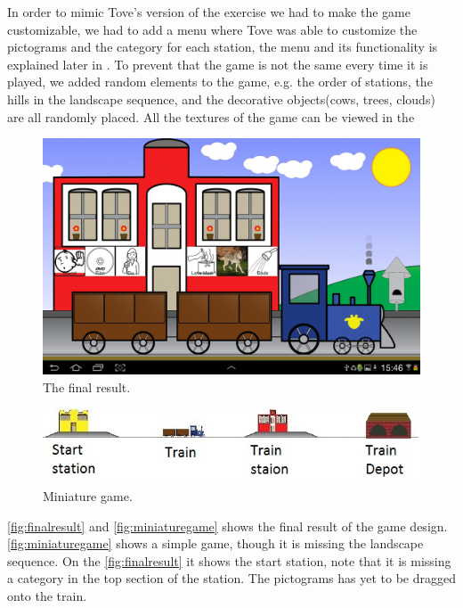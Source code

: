 In order to mimic Tove's version of the exercise we had to make the game customizable, we had to add a menu where Tove was able to customize the pictograms and the category for each station, the menu and its functionality is explained later in . To prevent that the game is not the same every time it is played, we added random elements to the game, e.g. the order of stations, the hills in the landscape sequence, and the decorative objects(cows, trees, clouds) are all randomly placed. All the textures of the game can be viewed in the 
\begin{figure}[H]
\centering
\includegraphics[width=0.9\linewidth]{img/screenshots/gamedesign1.jpg}
\caption{The final result.}
\label{fig:finalresult}
\end{figure}
\begin{figure}[H]
\centering
\includegraphics[width=0.9\linewidth]{img/screenshots/stations.jpg}
\caption{Miniature game.}
\label{fig:miniaturegame}
\end{figure}
\autoref{fig:finalresult} and \autoref{fig:miniaturegame} shows the final result of the game design. \autoref{fig:miniaturegame} shows a simple game, though it is missing the landscape sequence. On the \autoref{fig:finalresult} it shows the start station, note that it is missing a category in the top section of the station. The pictograms has yet to be dragged onto the train. 

